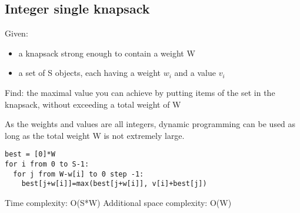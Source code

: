 \subsection{Integer single knapsack}
Given:
\begin{itemize}
\item{a knapsack strong enough to contain a weight W}
\item{a set of S objects, each having a weight $w_i$ and a value $v_i$}
\end{itemize}
Find: the maximal value you can achieve by putting items of the set in the knapsack, without exceeding a total weight of W

As the weights and values are all integers, dynamic programming can be used as long as the total weight W is not extremely large.
\begin{lstlisting}
best = [0]*W
for i from 0 to S-1:
  for j from W-w[i] to 0 step -1:
    best[j+w[i]]=max(best[j+w[i]], v[i]+best[j])
\end{lstlisting}
Time complexity: O(S*W)
Additional space complexity: O(W)

